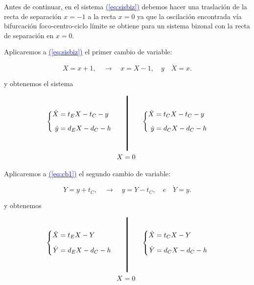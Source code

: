 \documentclass[12pt,a4paper]{report} %
\newcommand{\eref}[1]{\hyperref[#1]{\textcolor{blue}{(\ref*{#1})}}}
\newcommand{\eref}[1]{\hyperref[#1]{\textcolor{blue}{\textit{(\ref*{#1})}}}}
\begin{document}
	 \vspace{0.5cm} Antes de continuar, en el sistema \eref{eq:sisbiz} debemos hacer una traslación de la recta de separación $x=-1$  a la recta $x=0$ ya que la oscilación encontrada vía bifurcación foco-centro-ciclo límite se obtiene para un sistema bizonal con la recta de separación en $x=0$.
	
	\newpage
	
	\vspace{0.5cm}\noindent Aplicaremos a \eref{eq:sisbiz} el primer cambio de variable:
	
	\begin{equation}
		\label{eq:cambioo1}
		X=x+1, \quad \longrightarrow \quad x=X-1, \quad \textit{y} \quad \dot{X}=x.
	\end{equation}\smallskip

\noindent y obtenemos el sistema
	
	\begin{equation}
		\label{eq:cb1}
		\begin{gathered}
			\left\{
			\begin{aligned}
				\dot{X}&=t_EX-t_C-y
				\\[2mm]
				\dot{y}&=d_EX-d_C-h
			\end{aligned}
			\right. \qquad 
			\rule[-40pt]{1.5pt}{80pt} \qquad 
			\left\{
			\begin{aligned}
				\dot{X}&=t_CX-t_C-y
				\\[2mm]
				\dot{y}&=d_CX-d_C-h
			\end{aligned}
			\right. \\  \!\! X=0
		\end{gathered}
	\end{equation}\smallskip
	
	\vspace{0.5cm}\noindent Aplicaremos a \eref{eq:cb1} el segundo cambio de variable:
	
	\begin{equation}
		\label{eq:cambioo2}
		Y=y+t_C, \quad \longrightarrow \quad y=Y-t_C, \quad \textit{e} \quad \dot{Y}=y.
	\end{equation}\smallskip

\noindent y obtenemos
	
	\begin{equation}
		\label{eq:cb2}
		\begin{gathered}
			\left\{
			\begin{aligned}
				\dot{X}&=t_EX-Y
				\\[2mm]
				\dot{Y}&=d_EX-d_C-h
			\end{aligned}
			\right. \qquad 
			\rule[-40pt]{1.5pt}{80pt} \qquad 
			\left\{
			\begin{aligned}
				\dot{X}&=t_CX-Y
				\\[2mm]
				\dot{Y}&=d_CX-d_C-h
			\end{aligned}
			\right. \\  \!\! X=0
		\end{gathered}
	\end{equation}\smallskip
	
\end{document}
